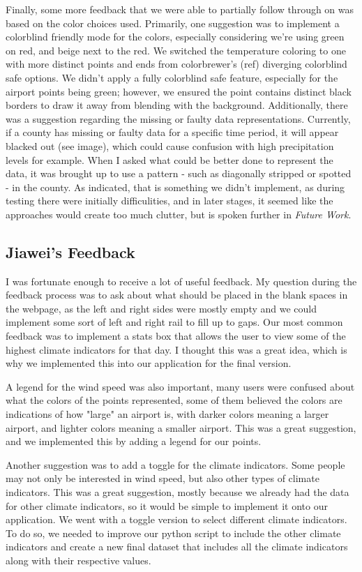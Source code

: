 \documentclass[9pt,twocolumn,twoside]{opticajnl}
\begin{document}
Finally, some more feedback that we were able to partially follow through on was based on the color choices used. Primarily, one suggestion was to implement a colorblind friendly mode for the colors, especially considering we're using green on red, and beige next to the red. We switched the temperature coloring to one with more distinct points and ends from colorbrewer's (ref) diverging colorblind safe options. We didn't apply a fully colorblind safe feature, especially for the airport points being green; however, we ensured the point contains distinct black borders to draw it away from blending with the background. Additionally, there was a suggestion regarding the missing or faulty data representations. Currently, if a county has missing or faulty data for a specific time period, it will appear blacked out (see image), which could cause confusion with high precipitation levels for example. When I asked what could be better done to represent the data, it was brought up to use a pattern - such as diagonally stripped or spotted - in the county. As indicated, that is something we didn't implement, as during testing there were initially difficulities, and in later stages, it seemed like the approaches would create too much clutter, but is spoken further in \textit{Future Work}.

\subsection{Jiawei's Feedback}
I was fortunate enough to receive a lot of useful feedback. My question during the feedback process was to ask about what should be placed in the blank spaces in the webpage, as the left and right sides were mostly empty and we could implement some sort of left and right rail to fill up to gaps. Our most common feedback was to implement a stats box that allows the user to view some of the highest climate indicators for that day. I thought this was a great idea, which is why we implemented this into our application for the final version.

A legend for the wind speed was also important, many users were confused about what the colors of the points represented, some of them believed the colors are indications of how "large" an airport is, with darker colors meaning a larger airport, and lighter colors meaning a smaller airport. This was a great suggestion, and we implemented this by adding a legend for our points.

Another suggestion was to add a toggle for the climate indicators. Some people may not only be interested in wind speed, but also other types of climate indicators. This was a great suggestion, mostly because we already had the data for other climate indicators, so it would be simple to implement it onto our application. We went with a toggle version to select different climate indicators. To do so, we needed to improve our python script to include the other climate indicators and create a new final dataset that includes all the climate indicators along with their respective values. 
\end{document}
